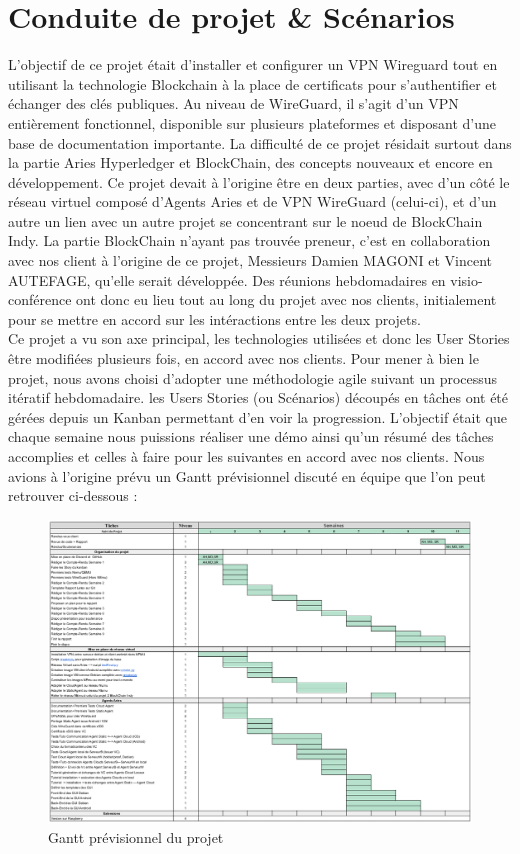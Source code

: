 \documentclass[12pt, openany]{report}
\begin{document}
\section{Conduite de projet \& Scénarios}
L'objectif de ce projet était d'installer et configurer un VPN Wireguard tout en utilisant la technologie Blockchain à la place de certificats pour s'authentifier et échanger des clés publiques. Au niveau de WireGuard, il s'agit d'un VPN entièrement fonctionnel, disponible sur plusieurs plateformes et disposant d'une base de documentation importante. La difficulté de ce projet résidait surtout dans la partie Aries Hyperledger et BlockChain, des concepts nouveaux et encore en développement. Ce projet devait à l'origine être en deux parties, avec d'un côté le réseau virtuel composé d'Agents Aries et de VPN WireGuard (celui-ci), et d'un autre un lien avec un autre projet se concentrant sur le noeud de BlockChain Indy. La partie BlockChain n'ayant pas trouvée preneur, c'est en collaboration avec nos client à l'origine de ce projet, Messieurs Damien MAGONI et Vincent AUTEFAGE, qu'elle serait développée. Des réunions hebdomadaires en visio-conférence ont donc eu lieu tout au long du projet avec nos clients, initialement pour se mettre en accord sur les intéractions entre les deux projets.\\
Ce projet a vu son axe principal, les technologies utilisées et donc les User Stories être modifiées plusieurs fois, en accord avec nos clients. Pour mener à bien le projet, nous avons choisi d'adopter une méthodologie agile suivant un processus itératif hebdomadaire. les Users Stories (ou Scénarios) découpés en tâches ont été gérées depuis un Kanban permettant d'en voir la progression. L'objectif était que chaque semaine nous puissions réaliser une démo ainsi qu'un résumé des tâches accomplies et celles à faire pour les suivantes en accord avec nos clients. Nous avions à l'origine prévu un Gantt prévisionnel discuté en équipe que l'on peut retrouver ci-dessous :
\begin{figure}[H]
\includegraphics[width=\textwidth]{gant_previ.png}
\centering
\caption{Gantt prévisionnel du projet}
\end{figure}
\end{document}
